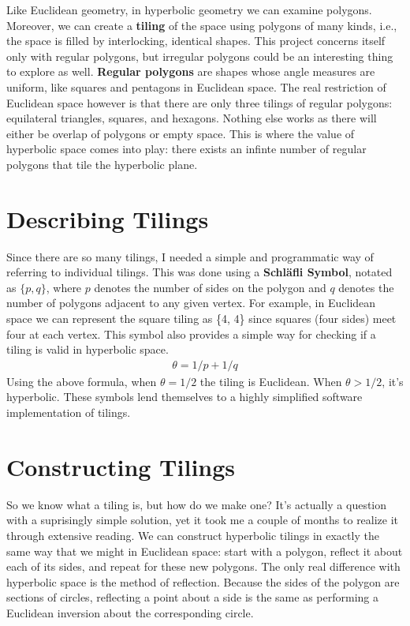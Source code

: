\documentclass[letterpaper,12pt]{article}
\begin{document}
Like Euclidean geometry, in hyperbolic geometry we can examine polygons. Moreover, we can create a \textbf{tiling} of the space using polygons of many kinds, i.e., the space is filled by interlocking, identical shapes. This project concerns itself only with regular polygons, but irregular polygons could be an interesting thing to explore as well. \textbf{Regular polygons} are shapes whose angle measures are uniform, like squares and pentagons in Euclidean space. The real restriction of Euclidean space however is that there are only three tilings of regular polygons: equilateral triangles, squares, and hexagons. Nothing else works as there will either be overlap of polygons or empty space. This is where the value of hyperbolic space comes into play: there exists an infinte number of regular polygons that tile the hyperbolic plane.

\section*{Describing Tilings}

Since there are so many tilings, I needed a simple and programmatic way of referring to individual tilings. This was done using a \textbf{Schl{\"a}fli Symbol}, notated as $\{p, q\}$, where $p$ denotes the number of sides on the polygon and $q$ denotes the number of polygons adjacent to any given vertex. For example, in Euclidean space we can represent the square tiling as \{4, 4\} since squares (four sides) meet four at each vertex. This symbol also provides a simple way for checking if a tiling is valid in hyperbolic space.
\begin{gather*}
\theta=1/p + 1/q
\end{gather*}
Using the above formula, when $\theta=1/2$ the tiling is Euclidean. When $\theta>1/2$, it's hyperbolic. These symbols lend themselves to a highly simplified software implementation of tilings.

\section*{Constructing Tilings}

So we know what a tiling is, but how do we make one? It's actually a question with a suprisingly simple solution, yet it took me a couple of months to realize it through extensive reading. We can construct hyperbolic tilings in exactly the same way that we might in Euclidean space: start with a polygon, reflect it about each of its sides, and repeat for these new polygons. The only real difference with hyperbolic space is the method of reflection. Because the sides of the polygon are sections of circles, reflecting a point about a side is the same as performing a Euclidean inversion about the corresponding circle.
\end{document}
